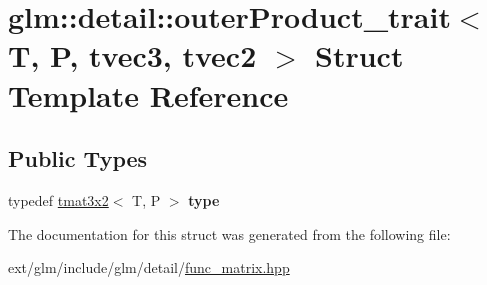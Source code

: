 \hypertarget{structglm_1_1detail_1_1outer_product__trait_3_01_t_00_01_p_00_01tvec3_00_01tvec2_01_4}{\section{glm\-:\-:detail\-:\-:outer\-Product\-\_\-trait$<$ T, P, tvec3, tvec2 $>$ Struct Template Reference}
\label{structglm_1_1detail_1_1outer_product__trait_3_01_t_00_01_p_00_01tvec3_00_01tvec2_01_4}
}
\subsection*{Public Types}
\begin{DoxyCompactItemize}
\item 
\hypertarget{structglm_1_1detail_1_1outer_product__trait_3_01_t_00_01_p_00_01tvec3_00_01tvec2_01_4_a241608939fa083f2ddb7c701be75a732}{typedef \hyperlink{structglm_1_1tmat3x2}{tmat3x2}$<$ T, P $>$ {\bfseries type}}\label{structglm_1_1detail_1_1outer_product__trait_3_01_t_00_01_p_00_01tvec3_00_01tvec2_01_4_a241608939fa083f2ddb7c701be75a732}

\end{DoxyCompactItemize}


The documentation for this struct was generated from the following file\-:\begin{DoxyCompactItemize}
\item 
ext/glm/include/glm/detail/\hyperlink{func__matrix_8hpp}{func\-\_\-matrix.\-hpp}\end{DoxyCompactItemize}
